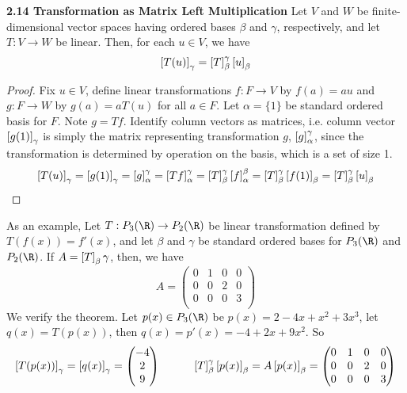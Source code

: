 \documentclass[11pt]{article}
\begin{document}
\begin{theorem*}
    \textbf{2.14 Transformation as Matrix Left Multiplication} Let $V$ and $W$ be finite-dimensional vector spaces having ordered bases $\beta$ and $\gamma$, respectively, and let $T:V\to W$ be linear. Then, for each $u\in V$, we have 
    \[
        \left[ T(u) \right]_{\gamma} = \left[ T \right]_{\beta}^{\gamma} \left[ u \right]_{\beta}
    \]
    \begin{proof}
        Fix $u\in V$, define linear transformations $f:F\to V$ by $f(a)=au$ and $g:F\to W$ by $g(a)=aT(u)$ for all $a\in F$. Let $\alpha=\{1\}$ be standard ordered basis for $F$. Note $g = Tf$. Identify column vectors as matrices, i.e. column vector $\left[ g(1) \right]_{\gamma}$ is simply the matrix representing transformation $g$, $\left[ g \right]_{\alpha}^{\gamma}$, since the transformation is determined by operation on the basis, which is a set of size 1. 
        \[
            \left[ T(u) \right]_{\gamma} = \left[ g(1) \right]_{\gamma}
            = \left[ g \right]_{\alpha}^{\gamma} = \left[ Tf \right]_{\alpha}^{\gamma}
            = \left[ T \right]_{\beta}^{\gamma} \left[ f \right]_{\alpha}^{\beta} 
            = \left[ T \right]_{\beta}^{\gamma} \left[ f(1) \right]_{\beta}
            = \left[ T \right]_{\beta}^{\gamma} \left[ u \right]_{\beta}
        \]
    \end{proof}
    As an example, Let $T:P_3(\R) \to P_2(\R)$ be linear transformation defined by $T(f(x)) = f'(x)$, and let $\beta$ and $\gamma$ be standard ordered bases for $P_3(\R)$ and $P_2(\R)$. If $A=\left[ T \right]_{\beta}{\gamma}$, then, we have 
    \[
        A = 
        \begin{pmatrix}
            0 & 1 & 0 & 0 \\
            0 & 0 & 2 & 0 \\
            0 & 0 & 0 & 3 \\ 
        \end{pmatrix}    
    \]
    We verify the theorem. Let $p(x)\in P_3(\R)$ be $p(x) = 2-4x+x^2+3x^3$, let $q(x) = T(p(x))$, then $q(x) = p'(x) = -4 + 2x + 9x^2$. So 
    \[
        \left[ T(p(x)) \right]_{\gamma} = \left[ q(x) \right]_{\gamma} = 
        \begin{pmatrix}
            -4 \\ 2 \\ 9
        \end{pmatrix}
        \quad \quad \quad 
        \left[ T \right]_{\beta}^{\gamma} \left[ p(x) \right]_{\beta} = A\left[ p(x) \right]_{\beta} = 
        \begin{pmatrix}
            0 & 1 & 0 & 0 \\
            0 & 0 & 2 & 0 \\
            0 & 0 & 0 & 3 \\ 

\end{pmatrix}\]
\end{theorem*}
\end{document}
